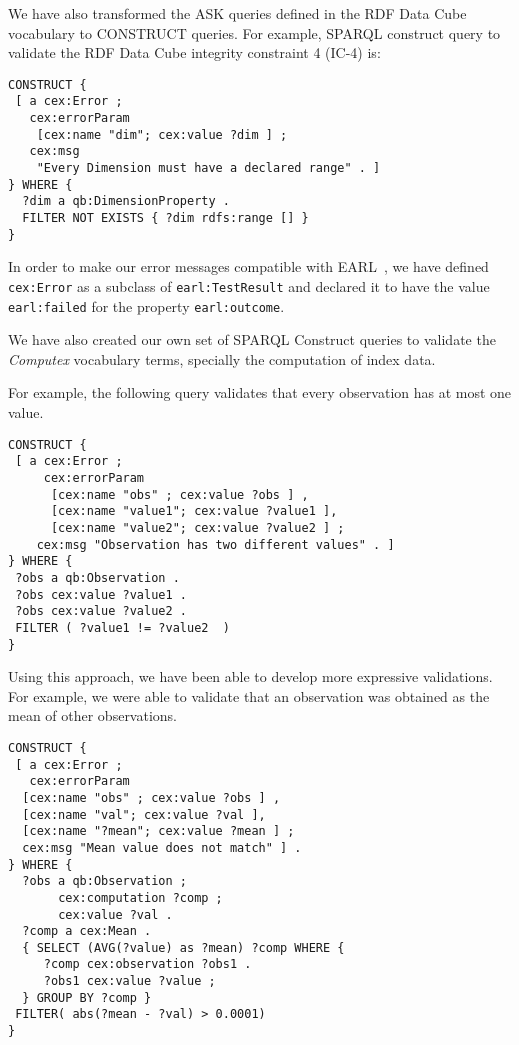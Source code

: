  We have also transformed the ASK queries defined in the RDF Data Cube
 vocabulary to CONSTRUCT queries. For example, SPARQL construct query to validate the RDF Data Cube integrity
 constraint 4 (IC-4) is:
 
\begin{lstlisting}[style=SPARQL]
CONSTRUCT {
 [ a cex:Error ;
   cex:errorParam 
	[cex:name "dim"; cex:value ?dim ] ;
   cex:msg 
    "Every Dimension must have a declared range" . ]
} WHERE {
  ?dim a qb:DimensionProperty .
  FILTER NOT EXISTS { ?dim rdfs:range [] }
}
\end{lstlisting}
 
 In order to make our error messages compatible with EARL~\cite{EARL}, we have
 defined \lstinline|cex:Error| as a subclass of \lstinline|earl:TestResult| and 
 declared it to have the value \lstinline|earl:failed| for the property
 \lstinline|earl:outcome|.
 
 We have also created our own set of SPARQL Construct queries to validate the
 \emph{Computex} vocabulary terms, specially the computation of index data.

For example, the following query validates that every observation 
  has at most one value.
 
\begin{lstlisting}[style=SPARQL]
CONSTRUCT {
 [ a cex:Error ;
     cex:errorParam 
	  [cex:name "obs" ; cex:value ?obs ] ,
	  [cex:name "value1"; cex:value ?value1 ],
	  [cex:name "value2"; cex:value ?value2 ] ;
    cex:msg "Observation has two different values" . ]
} WHERE {
 ?obs a qb:Observation .
 ?obs cex:value ?value1 .
 ?obs cex:value ?value2 .
 FILTER ( ?value1 != ?value2  )
}
\end{lstlisting}

Using this approach, we have been able to develop more expressive validations.
For example, we were able to validate that an observation was obtained as the
mean of other observations. 

\begin{lstlisting}[style=SPARQL]
CONSTRUCT {
 [ a cex:Error ;
   cex:errorParam 
  [cex:name "obs" ; cex:value ?obs ] ,
  [cex:name "val"; cex:value ?val ],
  [cex:name "?mean"; cex:value ?mean ] ;
  cex:msg "Mean value does not match" ] .
} WHERE {  
  ?obs a qb:Observation ;
       cex:computation ?comp ;
       cex:value ?val .
  ?comp a cex:Mean .
  { SELECT (AVG(?value) as ?mean) ?comp WHERE {
     ?comp cex:observation ?obs1 .
	 ?obs1 cex:value ?value ;
  } GROUP BY ?comp } 
 FILTER( abs(?mean - ?val) > 0.0001)
}
\end{lstlisting}

